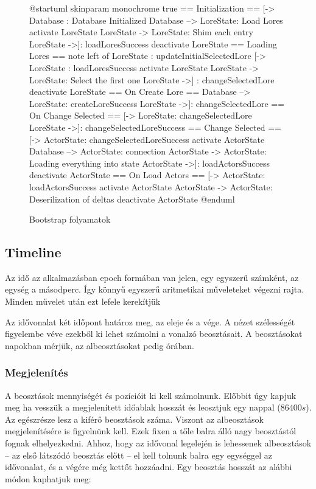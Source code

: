 \begin{figure}[h!]
	\centering
	\begin{plantuml}
		@startuml
		skinparam monochrome true
		== Initialization ==
		[-> Database : Database Initialized
		Database --> LoreState: Load Lores
		activate LoreState
		LoreState -> LoreState: Shim each entry
		LoreState ->]: loadLoresSuccess
		deactivate LoreState
		== Loading Lores ==
		note left of LoreState : updateInitialSelectedLore
		[-> LoreState : loadLoresSuccess
		activate LoreState
		LoreState -> LoreState: Select the first one
		LoreState ->] : changeSelectedLore
		deactivate LoreState
		== On Create Lore ==
		Database --> LoreState: createLoreSuccess
		LoreState ->]: changeSelectedLore
		== On Change Selected ==
		[-> LoreState: changeSelectedLore
		LoreState ->]: changeSelectedLoreSuccess
		== Change Selected ==
		[-> ActorState: changeSelectedLoreSuccess
		activate ActorState
		Database --> ActorState: connection
		ActorState -> ActorState: Loading everything into state
		ActorState ->]: loadActorsSuccess
		deactivate ActorState
		== On Load Actors ==
		[-> ActorState: loadActorsSuccess
		activate ActorState
		ActorState -> ActorState: Deserilization of deltas
		deactivate ActorState
		@enduml
	\end{plantuml}
	\caption{Bootstrap folyamatok}
	\label{fig:global-state-bootstrap}
\end{figure}

\pagebreak

\subsection{Timeline}

Az idő az alkalmazásban epoch \cite{Epoch} formában van jelen, egy egyszerű számként, az egység a másodperc. Így könnyű egyszerű aritmetikai műveleteket végezni rajta. Minden művelet után ezt lefele kerekítjük

Az idővonalat két időpont határoz meg, az eleje és a vége. A nézet szélességét figyelembe véve ezekből ki lehet számolni a vonalzó beosztásait. A beosztásokat napokban mérjük, az albeosztásokat pedig órában.

\subsubsection{Megjelenítés}

A beosztások mennyiségét és pozícióit ki kell számolnunk. Előbbit úgy kapjuk meg ha vesszük a megjelenített időablak hosszát és leosztjuk egy nappal ($86400s$). Az egészrésze lesz a kiférő beosztások száma. Viszont az albeosztások megjelenítésére is figyelnünk kell. Ezek fixen a tőle balra álló nagy beosztástól fognak elhelyezkedni. Ahhoz, hogy az idővonal legelején is lehessenek albeosztások -- az első látszódó beosztás előtt -- el kell tolnunk balra egy egységgel az idővonalat, és a végére még kettőt hozzáadni. Egy beosztás hosszát az alábbi módon kaphatjuk meg:

